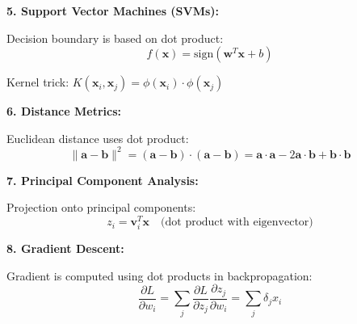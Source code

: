 \documentclass[12pt,a4paper]{article}
\theoremstyle{definition}
\begin{document}
\begin{tcolorbox}[enhanced,breakable,colback=red!5!white,colframe=red!75!black,title=Critical ML/DL Applications of Dot Product]
\textbf{5. Support Vector Machines (SVMs):}

Decision boundary is based on dot product:
\begin{equation}
f(\mathbf{x}) = \text{sign}(\mathbf{w}^T\mathbf{x} + b)
\end{equation}

Kernel trick: $K(\mathbf{x}_i, \mathbf{x}_j) = \phi(\mathbf{x}_i) \cdot \phi(\mathbf{x}_j)$

\textbf{6. Distance Metrics:}

Euclidean distance uses dot product:
\begin{equation}
\|\mathbf{a} - \mathbf{b}\|^2 = (\mathbf{a} - \mathbf{b}) \cdot (\mathbf{a} - \mathbf{b}) = \mathbf{a} \cdot \mathbf{a} - 2\mathbf{a} \cdot \mathbf{b} + \mathbf{b} \cdot \mathbf{b}
\end{equation}

\textbf{7. Principal Component Analysis:}

Projection onto principal components:
\begin{equation}
z_i = \mathbf{v}_i^T\mathbf{x} \quad \text{(dot product with eigenvector)}
\end{equation}

\textbf{8. Gradient Descent:}

Gradient is computed using dot products in backpropagation:
\begin{equation}
\frac{\partial L}{\partial w_i} = \sum_{j} \frac{\partial L}{\partial z_j} \frac{\partial z_j}{\partial w_i} = \sum_{j} \delta_j x_i
\end{equation}
\end{tcolorbox}
\end{document}

